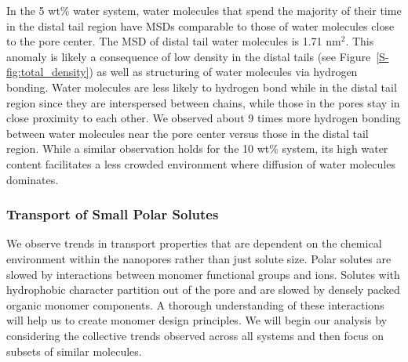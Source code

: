 \documentclass[journal=jpcbfk,manuscript=article]{achemso}
\begin{document}
  In the 5 wt\% water system, water molecules that spend the majority of their 
  time in the distal tail region have MSDs comparable to those of water molecules
  close to the pore center. The MSD of distal tail water molecules is 1.71 nm$^2$.
  This anomaly is likely a consequence of low density in the distal tails (see
  Figure~\ref{S-fig:total_density}) as well as structuring of water molecules via
  hydrogen bonding. 
Water molecules are less likely to hydrogen bond while in the
  distal tail region since they are interspersed between chains, while those in 
  the pores stay in close proximity to each other. We observed about 9 times more  %
 hydrogen bonding between water molecules near the pore center versus those in 
  the distal tail region. While a similar observation holds for the 10 wt\% system,
  its high water content facilitates a less crowded environment where diffusion
  of water molecules dominates.  
 \subsubsection{Transport of Small Polar Solutes}\label{section:general_transport_solutes}  
  
  We observe trends in transport properties that are dependent on the chemical 
  environment within the nanopores rather than just solute size. Polar solutes
  are slowed by interactions between monomer functional groups and ions. 
  Solutes
  with hydrophobic character partition out of the pore and are slowed by densely
  packed organic monomer components. 
  A thorough understanding of these interactions
  will help us to create monomer design principles. We will begin our analysis by
  considering the collective trends observed across all systems and then focus on
  subsets of similar molecules.
  
\end{document}
